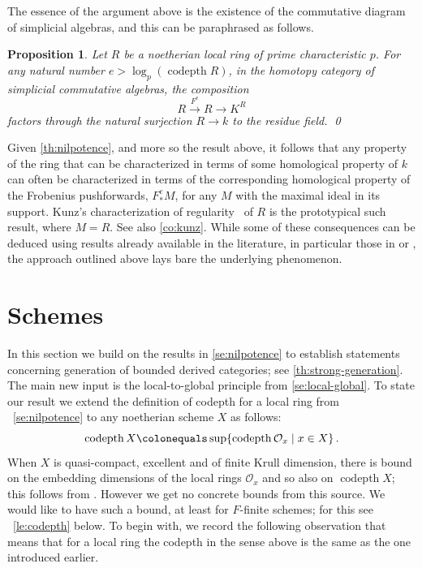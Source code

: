 \documentclass{amsart}
\newcommand{\xra}{\xrightarrow}
\newcommand{\mco}{\mathcal{O}}
\newcommand{\codepth}{\operatorname{codepth}}
\newcounter{intro}
\newtheorem{proposition}[subsection]{Proposition}
\theoremstyle{definition}
\theoremstyle{remark}
\numberwithin{equation}{subsection}
\begin{document}
The essence of the argument above is the existence of the commutative diagram of simplicial algebras, and this can be paraphrased as follows.

\begin{proposition}
\label{pr:nilpotence}
Let $R$ be a noetherian local ring of prime characteristic $p$. For any natural number $e> \log_p(\codepth R)$, in the homotopy category of simplicial commutative algebras, the composition 
\[
R\xra{F ^e}R\to K^R
\]
factors through the natural surjection $R\to k$ to the residue field. \qed
\end{proposition}

Given \cref{th:nilpotence}, and more so the result above, it follows that any property of the ring that can be characterized in terms of some homological property of $k$ can often be characterized in terms of the corresponding homological property of the Frobenius pushforwards, $F ^e_*M$, for any $M$ with the maximal ideal in its support. Kunz's characterization of regularity~\cite[Theorem~2.1]{Kunz:1969} of $R$ is the prototypical such result, where $M=R$. See also \cref{co:kunz}.
While some of these consequences can be deduced using results already available in the literature, in particular those  in \cite{Avramov/Iyengar/Miller:2006} or \cite{Koh/Lee:1998}, the approach outlined above lays bare the underlying phenomenon.

\section{Schemes}
\label{se:generation}

In this section we build on the results in \cref{se:nilpotence} to establish statements concerning generation of bounded derived categories; see \cref{th:strong-generation}. The main new input is the local-to-global principle from \cref{se:local-global}. To state our result we extend the definition of codepth for a local ring from ~\cref{se:nilpotence} to any noetherian scheme $X$ as follows:
\[
\codepth X \colonequals\sup\{\codepth {\mco}_{x} \mid x\in X\}\,.
\]
When $X$ is quasi-compact, excellent and of finite Krull dimension, there is bound on the embedding dimensions of the local rings $\mco_x$ and so also on $\codepth X$; this follows from \cite[Proposition~5.2]{Schoutens:2013}. However we get no concrete bounds from this source. We would like to have such a bound, at least for $F$-finite schemes; for this see ~\cref{le:codepth} below. To begin with, we record the following observation that means that for a local ring the codepth in the sense above is the same as the one introduced earlier.
\end{document}
